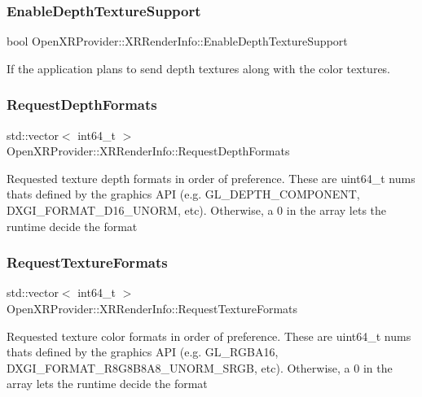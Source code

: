 \subsubsection{\texorpdfstring{EnableDepthTextureSupport}{EnableDepthTextureSupport}}
{\footnotesize\ttfamily bool Open\+X\+R\+Provider\+::\+X\+R\+Render\+Info\+::\+Enable\+Depth\+Texture\+Support}



If the application plans to send depth textures along with the color textures. 

\mbox{\label{struct_open_x_r_provider_1_1_x_r_render_info_aa4ba2f324a4ae14f1e51f2343dd1446b}} 
\subsubsection{\texorpdfstring{RequestDepthFormats}{RequestDepthFormats}}
{\footnotesize\ttfamily std\+::vector$<$ int64\+\_\+t $>$ Open\+X\+R\+Provider\+::\+X\+R\+Render\+Info\+::\+Request\+Depth\+Formats}

Requested texture depth formats in order of preference. These are uint64\+\_\+t nums that\textquotesingle{}s defined by the graphics A\+PI (e.\+g. G\+L\+\_\+\+D\+E\+P\+T\+H\+\_\+\+C\+O\+M\+P\+O\+N\+E\+NT, D\+X\+G\+I\+\_\+\+F\+O\+R\+M\+A\+T\+\_\+\+D16\+\_\+\+U\+N\+O\+RM, etc). Otherwise, a 0 in the array lets the runtime decide the format \mbox{\label{struct_open_x_r_provider_1_1_x_r_render_info_a84860b74dcb11fbc7494883b555f3029}} 
\subsubsection{\texorpdfstring{RequestTextureFormats}{RequestTextureFormats}}
{\footnotesize\ttfamily std\+::vector$<$ int64\+\_\+t $>$ Open\+X\+R\+Provider\+::\+X\+R\+Render\+Info\+::\+Request\+Texture\+Formats}

Requested texture color formats in order of preference. These are uint64\+\_\+t nums that\textquotesingle{}s defined by the graphics A\+PI (e.\+g. G\+L\+\_\+\+R\+G\+B\+A16, D\+X\+G\+I\+\_\+\+F\+O\+R\+M\+A\+T\+\_\+\+R8\+G8\+B8\+A8\+\_\+\+U\+N\+O\+R\+M\+\_\+\+S\+R\+GB, etc). Otherwise, a 0 in the array lets the runtime decide the format \mbox{\label{struct_open_x_r_provider_1_1_x_r_render_info_a9bf5bd224350b3fcc79a1643b8cc85f6}} 
